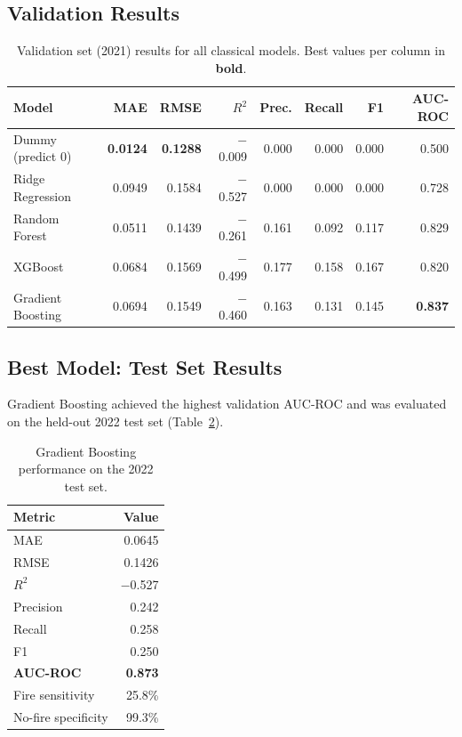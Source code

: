 \documentclass[11pt,a4paper]{article}
\begin{document}
\subsection{Validation Results}

\begin{table}[H]
\centering
\caption{Validation set (2021) results for all classical models.
         Best values per column in \textbf{bold}.}
\begin{tabular}{lrrrrrrr}
\toprule
\textbf{Model} & \textbf{MAE} & \textbf{RMSE} & \textbf{$R^2$} &
\textbf{Prec.} & \textbf{Recall} & \textbf{F1} & \textbf{AUC-ROC} \\
\midrule
Dummy (predict 0)  & \textbf{0.0124} & \textbf{0.1288} & $-$0.009 & 0.000 & 0.000 & 0.000 & 0.500 \\
Ridge Regression   & 0.0949 & 0.1584 & $-$0.527 & 0.000 & 0.000 & 0.000 & 0.728 \\
Random Forest      & 0.0511 & 0.1439 & $-$0.261 & 0.161 & 0.092 & 0.117 & 0.829 \\
XGBoost            & 0.0684 & 0.1569 & $-$0.499 & 0.177 & 0.158 & 0.167 & 0.820 \\
Gradient Boosting  & 0.0694 & 0.1549 & $-$0.460 & 0.163 & 0.131 & 0.145 & \textbf{0.837} \\
\bottomrule
\end{tabular}
\label{tab:val_results}
\end{table}

\subsection{Best Model: Test Set Results}

Gradient Boosting achieved the highest validation AUC-ROC and was
evaluated on the held-out 2022 test set (Table~\ref{tab:test_results}).

\begin{table}[H]
\centering
\caption{Gradient Boosting performance on the 2022 test set.}
\begin{tabular}{lr}
\toprule
\textbf{Metric} & \textbf{Value} \\
\midrule
MAE          & 0.0645 \\
RMSE         & 0.1426 \\
$R^2$        & $-$0.527 \\
Precision    & 0.242 \\
Recall       & 0.258 \\
F1           & 0.250 \\
\textbf{AUC-ROC} & \textbf{0.873} \\
Fire sensitivity     & 25.8\% \\
No-fire specificity  & 99.3\% \\
\bottomrule
\end{tabular}
\label{tab:test_results}
\end{table}
\end{document}
